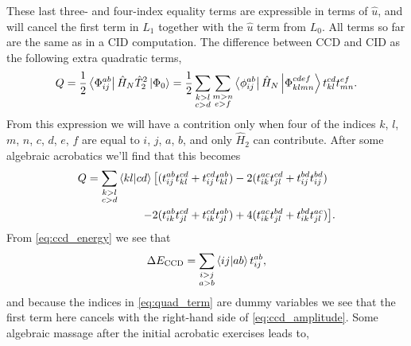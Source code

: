 These last three- and four-index equality terms are expressible in terms of $\hat{u}$,
and will cancel the first term in $L_1$ together with the $\hat{u}$ term from $L_0$.
All terms so far are the same as in a CID computation. The difference between CCD and
CID as the following extra quadratic terms,
\begin{equation}
    Q = \frac{1}{2}\bra{\Phi^{ab}_{ij}} \hat{H}_N \hat{T}_2^2\ket{\Phi_0}
        = \frac{1}{2} \sum_{\substack{k>l \\ c>d}} \sum_{\substack{m>n \\ e>f}}
            \bra{\phi^{ab}_{ij}} \hat{H}_N \ket{\Phi^{cdef}_{klmn}}t^{cd}_{kl}t^{ef}_{mn}.
\end{equation}
From this expression we will have a contrition only when four of the indices $k$, $l$,
$m$, $n$, $c$, $d$, $e$, $f$ are equal to $i$, $j$, $a$, $b$, and only $\hat{H}_2$
can contribute. After some algebraic acrobatics we'll find that this becomes
\begin{equation}
    \label{eq:quad_term}
    \begin{aligned}
        Q = \sum_{\substack{k>l \\ c>d}} \bra{kl} \ket{cd}\big[
                &(t^{ab}_{ij}t^{cd}_{kl} + t^{cd}_{ij}t^{ab}_{kl}) 
            -2   (t^{ac}_{ik}t^{cd}_{jl} + t^{bd}_{ij}t^{bd}_{ij}) \\
            -2  &(t^{ab}_{ik}t^{cd}_{jl} + t^{cd}_{ik}t^{ab}_{jl}) 
            +4   (t^{ac}_{ik}t^{bd}_{jl} + t^{bd}_{ik}t^{ac}_{jl})
            \big].
    \end{aligned}
\end{equation}
From \autoref{eq:ccd_energy} we see that
\begin{equation}
    \label{eq:ccd_energy2}
    \Delta E_{\text{CCD}} = \sum_{\substack{i>j \\ a>b}} \bra{ij} \ket{ab} t^{ab}_{ij},
\end{equation}
and because the indices in \autoref{eq:quad_term} are dummy variables we see that
the first term here cancels with the right-hand side of \autoref{eq:ccd_amplitude}.
Some algebraic massage after the initial acrobatic exercises leads to,
